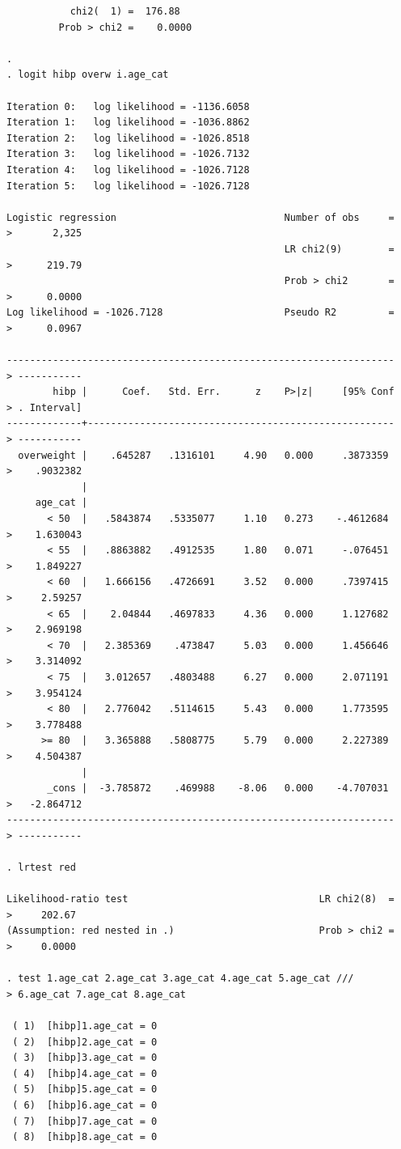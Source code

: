 \documentclass{article}
\begin{document}
\begin{enumerate}[a.]
\begin{verbatim}
           chi2(  1) =  176.88
         Prob > chi2 =    0.0000

. 
. logit hibp overw i.age_cat

Iteration 0:   log likelihood = -1136.6058  
Iteration 1:   log likelihood = -1036.8862  
Iteration 2:   log likelihood = -1026.8518  
Iteration 3:   log likelihood = -1026.7132  
Iteration 4:   log likelihood = -1026.7128  
Iteration 5:   log likelihood = -1026.7128  

Logistic regression                             Number of obs     =
>       2,325
                                                LR chi2(9)        =
>      219.79
                                                Prob > chi2       =
>      0.0000
Log likelihood = -1026.7128                     Pseudo R2         =
>      0.0967

-------------------------------------------------------------------
> -----------
        hibp |      Coef.   Std. Err.      z    P>|z|     [95% Conf
> . Interval]
-------------+-----------------------------------------------------
> -----------
  overweight |    .645287   .1316101     4.90   0.000     .3873359 
>    .9032382
             |
     age_cat |
       < 50  |   .5843874   .5335077     1.10   0.273    -.4612684 
>    1.630043
       < 55  |   .8863882   .4912535     1.80   0.071     -.076451 
>    1.849227
       < 60  |   1.666156   .4726691     3.52   0.000     .7397415 
>     2.59257
       < 65  |    2.04844   .4697833     4.36   0.000     1.127682 
>    2.969198
       < 70  |   2.385369    .473847     5.03   0.000     1.456646 
>    3.314092
       < 75  |   3.012657   .4803488     6.27   0.000     2.071191 
>    3.954124
       < 80  |   2.776042   .5114615     5.43   0.000     1.773595 
>    3.778488
      >= 80  |   3.365888   .5808775     5.79   0.000     2.227389 
>    4.504387
             |
       _cons |  -3.785872    .469988    -8.06   0.000    -4.707031 
>   -2.864712
-------------------------------------------------------------------
> -----------

. lrtest red

Likelihood-ratio test                                 LR chi2(8)  =
>     202.67
(Assumption: red nested in .)                         Prob > chi2 =
>     0.0000

. test 1.age_cat 2.age_cat 3.age_cat 4.age_cat 5.age_cat ///
> 6.age_cat 7.age_cat 8.age_cat

 ( 1)  [hibp]1.age_cat = 0
 ( 2)  [hibp]2.age_cat = 0
 ( 3)  [hibp]3.age_cat = 0
 ( 4)  [hibp]4.age_cat = 0
 ( 5)  [hibp]5.age_cat = 0
 ( 6)  [hibp]6.age_cat = 0
 ( 7)  [hibp]7.age_cat = 0
 ( 8)  [hibp]8.age_cat = 0


\end{verbatim}
\end{enumerate}
\end{document}
